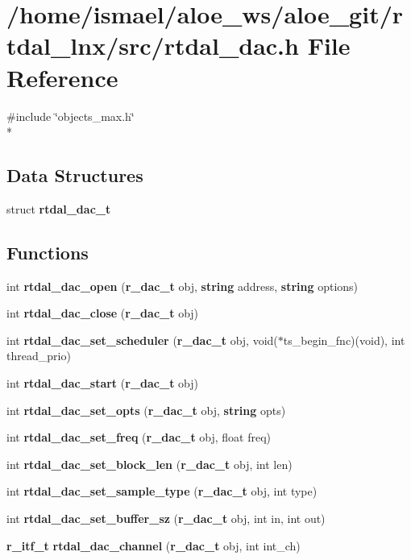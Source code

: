 \section{/home/ismael/aloe\-\_\-ws/aloe\-\_\-git/rtdal\-\_\-lnx/src/rtdal\-\_\-dac.h File Reference}
\label{rtdal__dac_8h}
{\ttfamily \#include \char`\"{}objects\-\_\-max.\-h\char`\"{}}\\*
\subsection*{Data Structures}
\begin{DoxyCompactItemize}
\item 
struct {\bf rtdal\-\_\-dac\-\_\-t}
\end{DoxyCompactItemize}
\subsection*{Functions}
\begin{DoxyCompactItemize}
\item 
int {\bf rtdal\-\_\-dac\-\_\-open} ({\bf r\-\_\-dac\-\_\-t} obj, {\bf string} address, {\bf string} options)
\item 
int {\bf rtdal\-\_\-dac\-\_\-close} ({\bf r\-\_\-dac\-\_\-t} obj)
\item 
int {\bf rtdal\-\_\-dac\-\_\-set\-\_\-scheduler} ({\bf r\-\_\-dac\-\_\-t} obj, void($\ast$ts\-\_\-begin\-\_\-fnc)(void), int thread\-\_\-prio)
\item 
int {\bf rtdal\-\_\-dac\-\_\-start} ({\bf r\-\_\-dac\-\_\-t} obj)
\item 
int {\bf rtdal\-\_\-dac\-\_\-set\-\_\-opts} ({\bf r\-\_\-dac\-\_\-t} obj, {\bf string} opts)
\item 
int {\bf rtdal\-\_\-dac\-\_\-set\-\_\-freq} ({\bf r\-\_\-dac\-\_\-t} obj, float freq)
\item 
int {\bf rtdal\-\_\-dac\-\_\-set\-\_\-block\-\_\-len} ({\bf r\-\_\-dac\-\_\-t} obj, int len)
\item 
int {\bf rtdal\-\_\-dac\-\_\-set\-\_\-sample\-\_\-type} ({\bf r\-\_\-dac\-\_\-t} obj, int type)
\item 
int {\bf rtdal\-\_\-dac\-\_\-set\-\_\-buffer\-\_\-sz} ({\bf r\-\_\-dac\-\_\-t} obj, int in, int out)
\item 
{\bf r\-\_\-itf\-\_\-t} {\bf rtdal\-\_\-dac\-\_\-channel} ({\bf r\-\_\-dac\-\_\-t} obj, int int\-\_\-ch)
\end{DoxyCompactItemize}


